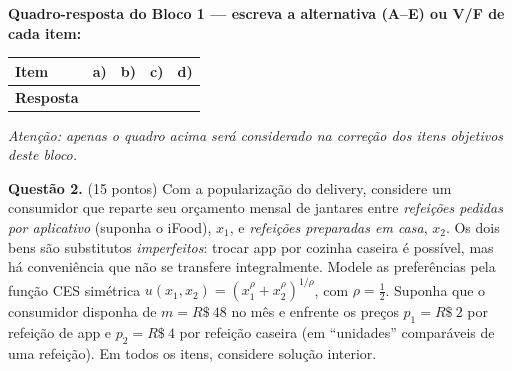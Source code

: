 \ifsolucao\else
\par\vspace{0.5em}
\begin{center}
\textbf{Quadro-resposta do Bloco 1 --- escreva a alternativa (A--E) ou V/F de cada item:}\\[0.6em]
\renewcommand{\arraystretch}{1.45}
\begin{tabular}{|>{\centering\arraybackslash}p{2.6cm}|>{\centering\arraybackslash}p{1.4cm}|>{\centering\arraybackslash}p{1.4cm}|>{\centering\arraybackslash}p{1.4cm}|>{\centering\arraybackslash}p{1.4cm}|}
  \hline
  \textbf{Item} & a) & b) & c) & d) \\ \hline
  \textbf{Resposta} &  &  &  &  \\ \hline
\end{tabular}
\end{center}
{\small\itshape Atenção: apenas o quadro acima será considerado na correção dos itens objetivos deste bloco.}\par\vspace{0.6em}
\fi

\textbf{Questão 2.} (15 pontos) Com a popularização do delivery, considere um consumidor que reparte seu orçamento mensal de jantares entre \emph{refeições pedidas por aplicativo} (suponha o iFood), $x_1$, e \emph{refeições preparadas em casa}, $x_2$. Os dois bens são substitutos \emph{imperfeitos}: trocar app por cozinha caseira é possível, mas há conveniência que não se transfere integralmente. Modele as preferências pela função CES simétrica $u(x_1,x_2)=\left(x_1^{\rho}+x_2^{\rho}\right)^{1/\rho}$, com $\rho=\tfrac12$. Suponha que o consumidor disponha de $m=R\$~48$ no mês e enfrente os preços $p_1=R\$~2$ por refeição de app e $p_2=R\$~4$ por refeição caseira (em ``unidades'' comparáveis de uma refeição). Em todos os itens, considere solução interior.

